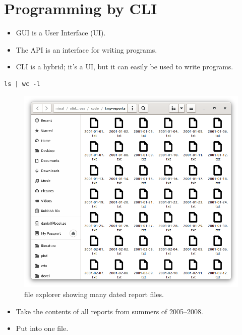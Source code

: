 \mode*

\section{Programming by CLI}

\begin{frame}[fragile]
  \begin{solution}
    \begin{itemize}
      \item GUI is a User Interface (UI).
      \item The API is an interface for writing programs.
      \item CLI is a hybrid; it's a UI, but it can easily be used to write 
        programs.
    \end{itemize}
  \end{solution}

  \begin{example}
    \begin{verbatim}
ls | wc -l
    \end{verbatim}
  \end{example}
\end{frame}

\begin{frame}
  \begin{figure}
    \includegraphics[height=0.5\textheight]{fig/many-reports.png}
    \caption{file explorer showing many dated report files.}
  \end{figure}

  \begin{exercise}
    \begin{itemize}
      \item Take the contents of all reports from summers of 2005--2008.
      \item Put into one file.
    \end{itemize}
  \end{exercise}
\end{frame}


